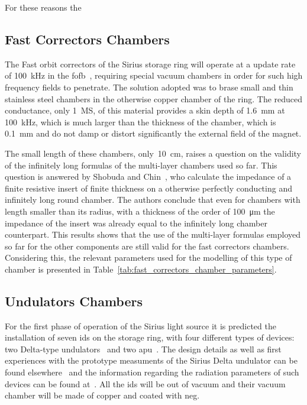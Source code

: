     For these reasons the

\subsection{Fast Correctors Chambers}

    The Fast orbit correctors of the Sirius storage ring will operate at a update rate of \SI{100}{\kilo\hertz} in the \gls{fofb}~\cite{Tavares2016}, requiring special vacuum chambers in order for such high frequency fields to penetrate. The solution adopted was to brase small and thin stainless steel chambers in the otherwise copper chamber of the ring. The reduced conductance, only \SI{1}{\mega\siemens}, of this material provides a skin depth of \SI{1.6}{\milli\meter} at \SI{100}{\kilo\hertz}, which is much larger than the thickness of the chamber, which is \SI{0.1}{\milli\meter} and do not damp or distort significantly the external field of the magnet.

    The small length of these chambers, only~\SI{10}{\centi\meter}, raises a question on the validity of the infinitely long formulas of the multi-layer chambers used so far. This question is answered by Shobuda and Chin~\cite{Shoduba2009}, who calculate the impedance of a finite resistive insert of finite thickness on a otherwise perfectly conducting and infinitely long round chamber. The authors conclude that even for chambers with length smaller than its radius, with a thickness of the order of \SI{100}{\micro\meter} the impedance of the insert was already equal to the infinitely long chamber counterpart. This results shows that the use of the multi-layer formulas employed so far for the other components are still valid for the fast correctors chambers. Considering this, the relevant parameters used for the modelling of this type of chamber is presented in Table~\ref{tab:fast_correctors_chamber_parameters}.

\subsection{Undulators Chambers}

    For the first phase of operation of the Sirius light source it is predicted the installation of seven \gls{ids} on the storage ring, with four different types of devices: two Delta-type undulators~\cite{DeltaRef} and two \gls{apu}~\cite{APURef}. The design details as well as first experiences with the prototype measuments of the Sirius Delta undulator can be found elsewhere~\cite{SiriusDelta1} and the information regarding the radiation parameters of such devices can be found at~\cite{wikisirius}. All the \gls{ids} will be out of vacuum and their vacuum chamber will be made of copper and coated with \gls{neg}.

